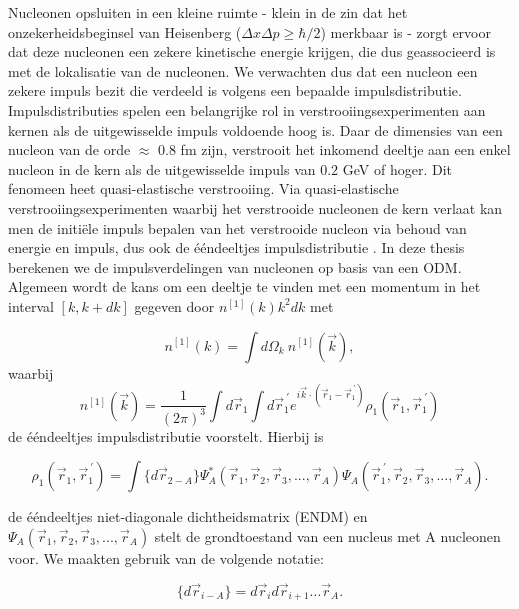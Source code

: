 \documentclass[11pt,twoside]{book}
\begin{document}
Nucleonen opsluiten in een kleine ruimte - klein in de zin dat het onzekerheidsbeginsel van Heisenberg ($\Delta x \Delta p \geq \hbar/2$) merkbaar is - zorgt ervoor dat deze nucleonen een zekere kinetische energie krijgen, die dus geassocieerd is met de lokalisatie van de nucleonen. We verwachten dus dat een nucleon een zekere impuls bezit die verdeeld is volgens een bepaalde impulsdistributie. Impulsdistributies spelen een belangrijke rol in verstrooiingsexperimenten aan kernen als de uitgewisselde impuls voldoende hoog is. Daar de dimensies van een nucleon van de orde $\approx$ 0.8 fm zijn, verstrooit het inkomend deeltje aan een enkel nucleon in de kern als de uitgewisselde impuls van $0.2$ GeV of hoger. Dit fenomeen heet quasi-elastische verstrooiing. Via quasi-elastische verstrooiingsexperimenten waarbij het verstrooide nucleonen de kern verlaat kan men de initi\"{e}le impuls bepalen van het verstrooide nucleon via behoud van energie en impuls, dus ook de \'{e}\'{e}ndeeltjes  impulsdistributie \cite{kobayashi}. In deze thesis berekenen we de impulsverdelingen van nucleonen op basis van een ODM.
Algemeen wordt de kans om een deeltje te vinden met een momentum in het interval $[k,k+dk]$ gegeven door $n^{[1]}(k) k^2dk$ met

\begin{equation} \label{eq:one_patricle_distr}
	n^{[1]}(k)=\int d\Omega_k\ n^{[1]}(\vec{k}),
\end{equation}
waarbij
\begin{equation} 
	n^{[1]}(\vec{k})=\frac{1}{(2\pi)^3}\int d\vec{r}_1 \int d\vec{r}_1^{\ \prime} e^{i\vec{k}\cdot (\vec{r}_1-\vec{r}^{\ \prime}_1)}\rho_1(\vec{r}_1,\vec{r}_1^{\ \prime})
\end{equation}
de \'{e}\'{e}ndeeltjes impulsdistributie voorstelt. Hierbij is

\begin{equation}
\rho_1(\vec{r}_1,\vec{r}^{\ \prime}_1) = \int \{d\vec{r}_{2-A}\} \Psi^*_A(\vec{r}_1,\vec{r}_2,\vec{r}_3, ... ,\vec{r}_A)\Psi_A(\vec{r}_1^{\ \prime},\vec{r}_2,\vec{r}_3, ... ,\vec{r}_A).
\end{equation}


de \'{e}\'{e}ndeeltjes niet-diagonale dichtheidsmatrix (ENDM) en $\Psi_A(\vec{r}_1,\vec{r}_2,\vec{r}_3, ... ,\vec{r}_A)$ stelt de grondtoestand van een nucleus met A nucleonen voor. We maakten gebruik van de volgende notatie:

\begin{equation}
\{d\vec{r}_{i-A}\}  = d\vec{r}_i d\vec{r}_{i+1}...\vec{r}_A.
\end{equation}
 
\end{document}
